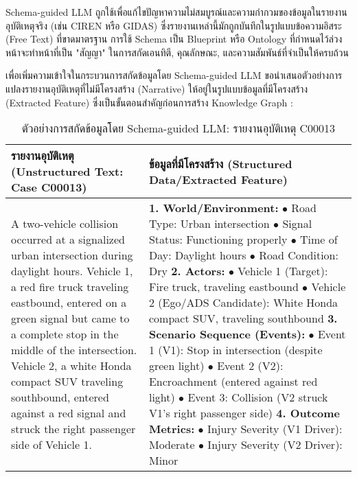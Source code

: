 Schema-guided LLM ถูกใช้เพื่อแก้ไขปัญหาความไม่สมบูรณ์และความกำกวมของข้อมูลในรายงานอุบัติเหตุจริง (เช่น CIREN หรือ GIDAS) \cite{nhtsa_ciren, gidas_study} ซึ่งรายงานเหล่านี้มักถูกบันทึกในรูปแบบข้อความอิสระ (Free Text) ที่ขาดมาตรฐาน การใช้ Schema เป็น Blueprint หรือ Ontology ที่กำหนดไว้ล่วงหน้าจะทำหน้าที่เป็น "สัญญา" ในการสกัดเอนทิตี, คุณลักษณะ, และความสัมพันธ์ที่จำเป็นให้ครบถ้วน

เพื่อเพิ่มความเข้าใจในกระบวนการสกัดข้อมูลโดย Schema-guided LLM ขอนำเสนอตัวอย่างการแปลงรายงานอุบัติเหตุที่ไม่มีโครงสร้าง (Narrative) ให้อยู่ในรูปแบบข้อมูลที่มีโครงสร้าง (Extracted Feature) ซึ่งเป็นขั้นตอนสำคัญก่อนการสร้าง Knowledge Graph \cite{bagschik2018ontology}:

\begin{table}[h!]
\centering
\caption{ตัวอย่างการสกัดข้อมูลโดย Schema-guided LLM: รายงานอุบัติเหตุ C00013}
\label{tab:sgllm_example}
\begin{tabularx}{\textwidth}{|p{}|X|}
\hline
\rowcolor{gray!20} รายงานอุบัติเหตุ (Unstructured Text: Case C00013) & ข้อมูลที่มีโครงสร้าง (Structured Data/Extracted Feature) \\
\hline
A two-vehicle collision occurred at a signalized urban intersection during daylight hours. Vehicle 1, a red fire truck traveling eastbound, entered on a green signal but came to a complete stop in the middle of the intersection. Vehicle 2, a white Honda compact SUV traveling southbound, entered against a red signal and struck the right passenger side of Vehicle 1. & \textbf{1. World/Environment:} \newline
\quad $\bullet$ Road Type: Urban intersection \newline
\quad $\bullet$ Signal Status: Functioning properly \newline
\quad $\bullet$ Time of Day: Daylight hours \newline
\quad $\bullet$ Road Condition: Dry \newline
\textbf{2. Actors:} \newline
\quad $\bullet$ Vehicle 1 (Target): Fire truck, traveling eastbound \newline
\quad $\bullet$ Vehicle 2 (Ego/ADS Candidate): White Honda compact SUV, traveling southbound \newline
\textbf{3. Scenario Sequence (Events):} \newline
\quad $\bullet$ Event 1 (V1): Stop in intersection (despite green light) \newline
\quad $\bullet$ Event 2 (V2): Encroachment (entered against red light) \newline
\quad $\bullet$ Event 3: Collision (V2 struck V1's right passenger side) \newline
\textbf{4. Outcome Metrics:} \newline
\quad $\bullet$ Injury Severity (V1 Driver): Moderate \newline
\quad $\bullet$ Injury Severity (V2 Driver): Minor \\
\hline
\end{tabularx}
\end{table}


